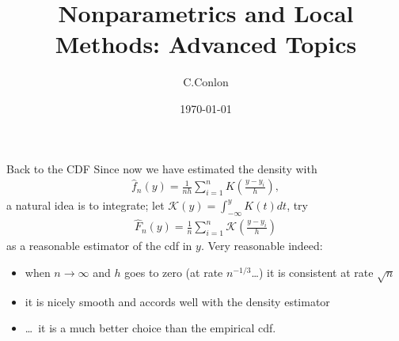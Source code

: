 

\title [Nonparametrics]{Nonparametrics and Local Methods: Advanced Topics}
\author{C.Conlon}
\date{\today}


\begin{frame}
\titlepage
\end{frame}



\begin{frame}{Back to the CDF}
\small
Since now we have estimated the density with
\begin{align*}
{\hat f}_n(y)= \frac{1}{nh}\sum_{i=1}^n K\left(
\frac{y-y_i}{h}\right),
\end{align*}
a natural idea is to integrate; let $\mathcal{K}(y)=\int_{-\infty}^y K(t)dt$, try
\begin{align*}
{\hat F}_n(y)= \frac{1}{n}\sum_{i=1}^n \mathcal{K}\left(
\frac{y-y_i}{h}\right)
\end{align*}
as a reasonable estimator of the cdf in $y$.
Very reasonable indeed:
\begin{itemize}
  \item when $n \longrightarrow \infty$ and $h$ goes to zero (at rate
    $n^{-1/3}$\ldots) 
it is consistent at rate $\sqrt{n}$
\item it is nicely smooth and accords well with the density estimator
\item \ldots\ it is a much better choice than the empirical cdf.
\end{itemize}
\end{frame}


